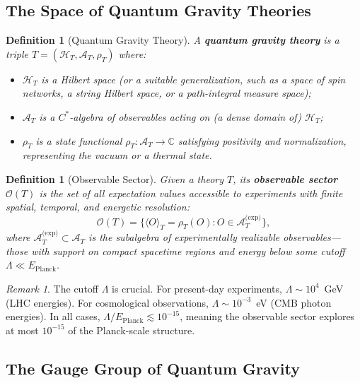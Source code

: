 \documentclass[12pt,a4paper]{article}
\newcommand{\braket}[1]{\langle #1 \rangle}
\newtheorem{definition}[theorem]{Definition}
\theoremstyle{remark}
\newtheorem{remark}[theorem]{Remark}
\newcommand{\C}{\mathbb{C}}
\newcommand{\Obs}{\mathcal{O}}
\newcommand{\A}{\mathcal{A}}
\newcommand{\Hilb}{\mathcal{H}}
\begin{document}
\subsection{The Space of Quantum Gravity Theories}

\begin{definition}[Quantum Gravity Theory]
\label{def:qg_theory}
A \textbf{quantum gravity theory} is a triple $T = (\Hilb_T, \A_T, \rho_T)$ where:
\begin{itemize}[leftmargin=*]
  \item $\Hilb_T$ is a Hilbert space (or a suitable generalization, such as a space of spin networks, a string Hilbert space, or a path-integral measure space);
  \item $\A_T$ is a $C^*$-algebra of observables acting on (a dense domain of) $\Hilb_T$;
  \item $\rho_T$ is a state functional $\rho_T: \A_T \to \C$ satisfying positivity and normalization, representing the vacuum or a thermal state.
\end{itemize}
\end{definition}

\begin{definition}[Observable Sector]
\label{def:observable_sector}
Given a theory $T$, its \textbf{observable sector} $\Obs(T)$ is the set of all expectation values accessible to experiments with finite spatial, temporal, and energetic resolution:
\begin{equation}
  \label{eq:obs_sector}
  \Obs(T) = \{\braket{O}_{T} = \rho_T(O) : O \in \A_T^{\text{(exp)}}\},
\end{equation}
where $\A_T^{\text{(exp)}} \subset \A_T$ is the subalgebra of experimentally realizable observables---those with support on compact spacetime regions and energy below some cutoff $\Lambda \ll E_{\text{Planck}}$.
\end{definition}

\begin{remark}
\label{rem:obs_cutoff}
The cutoff $\Lambda$ is crucial. For present-day experiments, $\Lambda \sim 10^4$~GeV (LHC energies). For cosmological observations, $\Lambda \sim 10^{-3}$~eV (CMB photon energies). In all cases, $\Lambda / E_{\text{Planck}} \lesssim 10^{-15}$, meaning the observable sector explores at most $10^{-15}$ of the Planck-scale structure.
\end{remark}

\subsection{The Gauge Group of Quantum Gravity}
\end{document}
